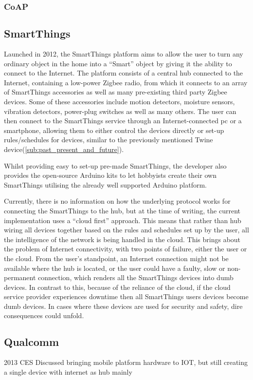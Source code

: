 

\subsubsection{CoAP} %
\label{ssub:coap}


\subsection{SmartThings} %
\label{sub:smart_things}
Launched in 2012, the SmartThings platform aims to allow the user to turn any ordinary object in the home into a ``Smart'' object by giving it the ability to connect to the Internet. The platform consists of a central hub connected to the Internet, containing a low-power Zigbee radio, from which it connects to an array of SmartThings accessories as well as many pre-existing third party Zigbee devices. Some of these accessories include motion detectors, moisture sensors, vibration detectors, power-plug switches as well as many others. The user can then connect to the SmartThings service through an Internet-connected pc or a smartphone, allowing them to either control the devices directly or set-up rules/schedules for devices, similar to the previously mentioned Twine device(\ref{sub:past_present_and_future}). 

Whilst providing easy to set-up pre-made SmartThings, the developer also provides the open-source Arduino kits to let hobbyists create their own SmartThings utilising the already well supported Arduino platform.

Currently, there is no information on how the underlying protocol works for connecting the SmartThings to the hub, but at the time of writing, the current implementation uses a ``cloud first'' approach. This means that rather than hub wiring all devices together based on the rules and schedules set up by the user, all the intelligence of the network is being handled in the cloud. This brings about the problem of Internet connectivity, with two points of failure, either the user or the cloud. From the user's standpoint, an Internet connection might not be available where the hub is located, or the user could have a faulty, slow or non-permanent connection, which renders all the SmartThings devices into dumb devices. In contrast to this, because of the reliance of the cloud, if the cloud service provider experiences downtime then all SmartThings users devices become dumb devices. In cases where these devices are used for security and safety, dire consequences could unfold.
  



\subsection{Qualcomm} %
\label{sub:qualcomm}
2013 CES Discussed bringing mobile platform hardware to IOT, but still creating a single device with internet as hub mainly 


